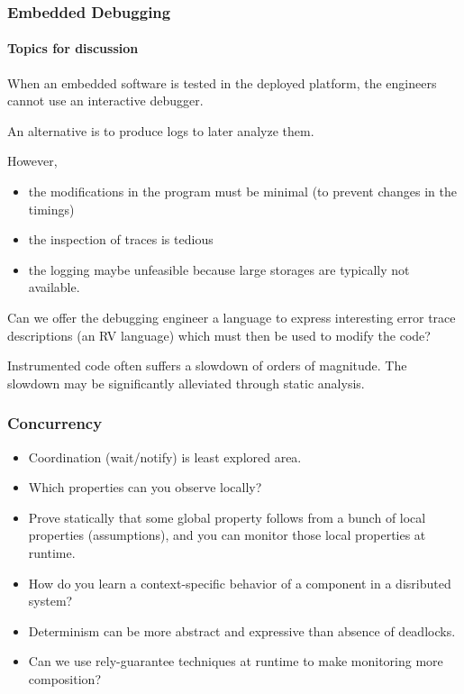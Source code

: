 \documentclass{beamer}
\begin{document}
\begin{frame}
  \frametitle{Embedded Debugging}
  \framesubtitle{Topics for discussion}

When an embedded software is tested in the deployed platform, the
engineers cannot use an interactive debugger. 

An alternative is to produce logs to later analyze them. 

However, 
\begin{itemize} 
\item the modifications in the program must be minimal (to prevent changes in
the timings) 
\item the inspection of traces is tedious
\item the logging
maybe unfeasible because large storages are typically not available. 
\end{itemize}

Can we offer the debugging engineer a language to
express interesting error trace descriptions (an RV language) which
must then be used to modify the code? 


Instrumented code often suffers a slowdown of orders of magnitude. 
The slowdown may be significantly alleviated through static analysis.

\end{frame}


\begin{frame}
  \frametitle{Concurrency}

\begin{itemize}

\item Coordination (wait/notify) is least explored area. 

\item Which properties can you observe locally? 


\item Prove statically that some global property follows from a bunch of local properties (assumptions), and you can monitor those local properties at runtime.

\item How do you learn a context-specific behavior of a component in a disributed system?

\item Determinism can be more abstract and expressive than absence of deadlocks.

\item Can we use rely-guarantee techniques at runtime to make monitoring more composition?

\end{itemize}

\end{frame}
\end{document}
